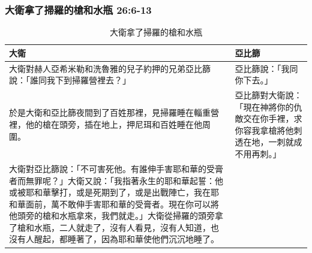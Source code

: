 \subsubsection{大衛拿了掃羅的槍和水瓶 26:6-13}
\begin{table}[H]
\hspace*{-5mm}
\centering
\begin{tabular}{p{10.25cm}|p{7.75cm}}\hline\hline
大衛&亞比篩\\\hline
大衛對赫人亞希米勒和洗魯雅的兒子約押的兄弟亞比篩說：「誰同我下到掃羅營裡去？」&亞比篩說：「我同你下去。」 \\\hline
於是大衛和亞比篩夜間到了百姓那裡，見掃羅睡在輜重營裡，他的槍在頭旁，插在地上，押尼珥和百姓睡在他周圍。&亞比篩對大衛說：「現在神將你的仇敵交在你手裡，求你容我拿槍將他刺透在地，一刺就成不用再刺。」 \\\hline
大衛對亞比篩說：「不可害死他。有誰伸手害耶和華的受膏者而無罪呢？」大衛又說：「我指著永生的耶和華起誓：他或被耶和華擊打，或是死期到了，或是出戰陣亡，我在耶和華面前，萬不敢伸手害耶和華的受膏者。現在你可以將他頭旁的槍和水瓶拿來，我們就走。」大衛從掃羅的頭旁拿了槍和水瓶，二人就走了，沒有人看見，沒有人知道，也沒有人醒起，都睡著了，因為耶和華使他們沉沉地睡了。& \\\hline
\end{tabular}
\caption{大衛拿了掃羅的槍和水瓶}
\end{table}
 


